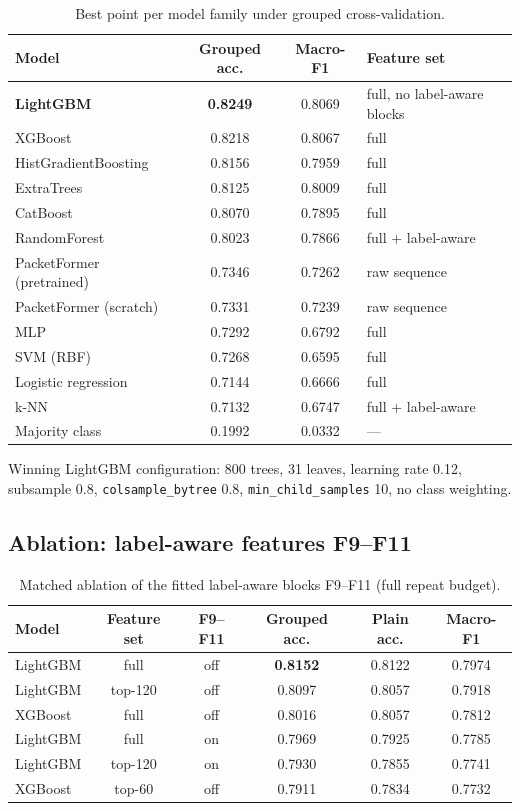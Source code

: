 \documentclass[11pt]{article}
\begin{document}
\begin{table}[htbp]
\centering\small
\caption{Best point per model family under grouped cross-validation.}
\label{tab:leaderboard}
\begin{tabular}{lcc l}
\toprule
Model & Grouped acc. & Macro-F1 & Feature set \\
\midrule
\textbf{LightGBM} & \textbf{0.8249} & 0.8069 & full, no label-aware blocks \\
XGBoost & 0.8218 & 0.8067 & full \\
HistGradientBoosting & 0.8156 & 0.7959 & full \\
ExtraTrees & 0.8125 & 0.8009 & full \\
CatBoost & 0.8070 & 0.7895 & full \\
RandomForest & 0.8023 & 0.7866 & full + label-aware \\
PacketFormer (pretrained) & 0.7346 & 0.7262 & raw sequence \\
PacketFormer (scratch) & 0.7331 & 0.7239 & raw sequence \\
MLP & 0.7292 & 0.6792 & full \\
SVM (RBF) & 0.7268 & 0.6595 & full \\
Logistic regression & 0.7144 & 0.6666 & full \\
k-NN & 0.7132 & 0.6747 & full + label-aware \\
Majority class & 0.1992 & 0.0332 & --- \\
\bottomrule
\end{tabular}
\end{table}

Winning LightGBM configuration: 800 trees, 31 leaves, learning rate 0.12, subsample 0.8,
\texttt{colsample\_bytree} 0.8, \texttt{min\_child\_samples} 10, no class weighting.

\subsection{Ablation: label-aware features F9--F11}

\begin{table}[htbp]
\centering\small
\caption{Matched ablation of the fitted label-aware blocks F9--F11 (full repeat budget).}
\label{tab:f9}
\begin{tabular}{lccccc}
\toprule
Model & Feature set & F9--F11 & Grouped acc. & Plain acc. & Macro-F1 \\
\midrule
LightGBM & full & off & \textbf{0.8152} & 0.8122 & 0.7974 \\
LightGBM & top-120 & off & 0.8097 & 0.8057 & 0.7918 \\
XGBoost & full & off & 0.8016 & 0.8057 & 0.7812 \\
LightGBM & full & on & 0.7969 & 0.7925 & 0.7785 \\
LightGBM & top-120 & on & 0.7930 & 0.7855 & 0.7741 \\
XGBoost & top-60 & off & 0.7911 & 0.7834 & 0.7732 \\
\bottomrule
\end{tabular}
\end{table}
\end{document}
